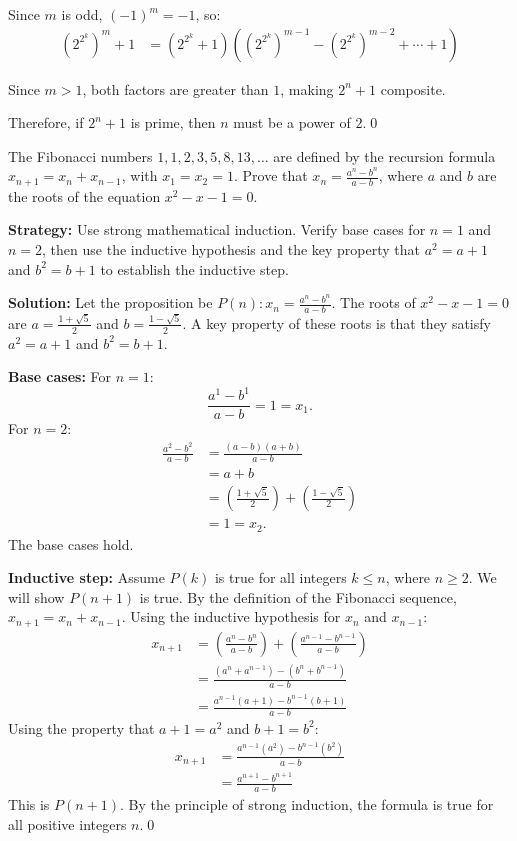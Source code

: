 Since $m$ is odd, $(-1)^m = -1$, so:
\begin{align*}
(2^{2^k})^m + 1 &= (2^{2^k} + 1)((2^{2^k})^{m-1} - (2^{2^k})^{m-2} + \cdots + 1)
\end{align*}

Since $m > 1$, both factors are greater than $1$, making $2^n + 1$ composite.

Therefore, if $2^n + 1$ is prime, then $n$ must be a power of $2$.\qed



\begin{problembox}
\begin{problemstatement}
The Fibonacci numbers $1, 1, 2, 3, 5, 8, 13, \dots$ are defined by the recursion formula $x_{n+1} = x_n + x_{n-1}$, with $x_1 = x_2 = 1$. Prove that $x_n = \frac{a^n - b^n}{a - b}$, where $a$ and $b$ are the roots of the equation $x^2 - x - 1 = 0$.
\end{problemstatement}
\end{problembox}

\noindent\textbf{Strategy:} Use strong mathematical induction. Verify base cases for $n=1$ and $n=2$, then use the inductive hypothesis and the key property that $a^2 = a+1$ and $b^2 = b+1$ to establish the inductive step.

\bigskip\noindent\textbf{Solution:}
Let the proposition be $P(n): x_n = \frac{a^n - b^n}{a-b}$. The roots of $x^2 - x - 1 = 0$ are $a = \frac{1+\sqrt{5}}{2}$ and $b = \frac{1-\sqrt{5}}{2}$.
A key property of these roots is that they satisfy $a^2 = a+1$ and $b^2 = b+1$.

\textbf{Base cases:}
For $n=1$:
\[ \frac{a^1 - b^1}{a-b} = 1 = x_1. \]
For $n=2$:
\begin{align*}
\frac{a^2 - b^2}{a-b} &= \frac{(a-b)(a+b)}{a-b}\\
&= a+b\\
&= \left(\frac{1+\sqrt{5}}{2}\right) + \left(\frac{1-\sqrt{5}}{2}\right)\\
&= 1 = x_2.
\end{align*}
The base cases hold.

\textbf{Inductive step:}
Assume $P(k)$ is true for all integers $k \leq n$, where $n \geq 2$. We will show $P(n+1)$ is true.
By the definition of the Fibonacci sequence, $x_{n+1} = x_n + x_{n-1}$.
Using the inductive hypothesis for $x_n$ and $x_{n-1}$:
\begin{align*}
x_{n+1} &= \left( \frac{a^n - b^n}{a-b} \right) + \left( \frac{a^{n-1} - b^{n-1}}{a-b} \right) \\
&= \frac{(a^n + a^{n-1}) - (b^n + b^{n-1})}{a-b} \\
&= \frac{a^{n-1}(a+1) - b^{n-1}(b+1)}{a-b}
\end{align*}
Using the property that $a+1 = a^2$ and $b+1 = b^2$:
\begin{align*}
x_{n+1} &= \frac{a^{n-1}(a^2) - b^{n-1}(b^2)}{a-b} \\
&= \frac{a^{n+1} - b^{n+1}}{a-b}
\end{align*}
This is $P(n+1)$. By the principle of strong induction, the formula is true for all positive integers $n$.\qed




